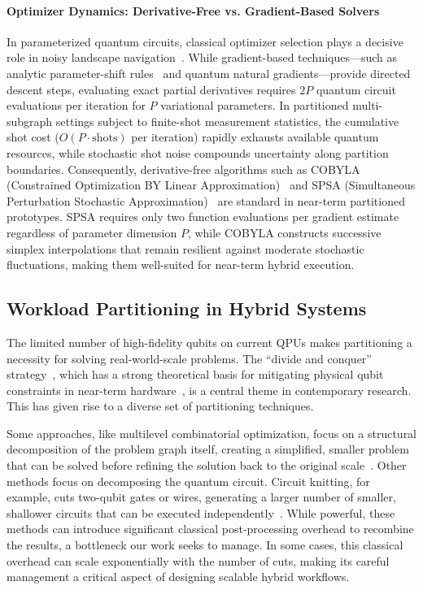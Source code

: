 \documentclass[pdflatex,sn-mathphys-num]{sn-jnl}
\theoremstyle{thmstyleone}
\theoremstyle{thmstyletwo}%
\theoremstyle{thmstylethree}%
\begin{document}
\paragraph{Optimizer Dynamics: Derivative-Free vs. Gradient-Based Solvers} In parameterized quantum circuits, classical optimizer selection plays a decisive role in noisy landscape navigation~\cite{Dutta2024PracticalityOTU, Peruzzo2013AVEM}. While gradient-based techniques—such as analytic parameter-shift rules~\cite{Mitarai2018QuantumCA} and quantum natural gradients—provide directed descent steps, evaluating exact partial derivatives requires $2P$ quantum circuit evaluations per iteration for $P$ variational parameters. In partitioned multi-subgraph settings subject to finite-shot measurement statistics, the cumulative shot cost ($O(P \cdot \text{shots})$ per iteration) rapidly exhausts available quantum resources, while stochastic shot noise compounds uncertainty along partition boundaries. Consequently, derivative-free algorithms such as COBYLA (Constrained Optimization BY Linear Approximation)~\cite{Powell1994ADF} and SPSA (Simultaneous Perturbation Stochastic Approximation)~\cite{Spall1992MultivariateSA} are standard in near-term partitioned prototypes. SPSA requires only two function evaluations per gradient estimate regardless of parameter dimension $P$, while COBYLA constructs successive simplex interpolations that remain resilient against moderate stochastic fluctuations, making them well-suited for near-term hybrid execution.

\subsection{Workload Partitioning in Hybrid Systems}

The limited number of high-fidelity qubits on current QPUs makes partitioning a necessity for solving real-world-scale problems. The ``divide and conquer'' strategy~\cite{Ge2019AHAI, Tang2022ScaleQCASX, Bhatotia2024QuantumClassicalCVH}, which has a strong theoretical basis for mitigating physical qubit constraints in near-term hardware~\cite{Ge2019AHAI}, is a central theme in contemporary research. This has given rise to a diverse set of partitioning techniques.

Some approaches, like multilevel combinatorial optimization, focus on a structural decomposition of the problem graph itself, creating a simplified, smaller problem that can be solved before refining the solution back to the original scale~\cite{Angone2023HybridQMD, UshijimaMwesigwa2019MultilevelCOS}. Other methods focus on decomposing the quantum circuit. Circuit knitting, for example, cuts two-qubit gates or wires, generating a larger number of smaller, shallower circuits that can be executed independently~\cite{Bhatotia2024QuantumClassicalCVH}. While powerful, these methods can introduce significant classical post-processing overhead to recombine the results, a bottleneck our work seeks to manage. In some cases, this classical overhead can scale exponentially with the number of cuts, making its careful management a critical aspect of designing scalable hybrid workflows.
\end{document}
